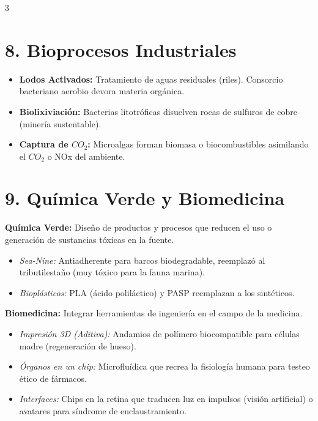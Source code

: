 \documentclass[9pt,letterpaper]{extarticle}
\begin{document}
\begin{multicols*}{3}
	\section*{8. Bioprocesos Industriales}
	\begin{itemize}
		\item \textbf{Lodos Activados:} Tratamiento de aguas residuales (riles). Consorcio bacteriano aerobio devora materia orgánica.
		\item \textbf{Biolixiviación:} Bacterias litotróficas disuelven rocas de sulfuros de cobre (minería sustentable).
		\item \textbf{Captura de $CO_2$:} Microalgas forman biomasa o biocombustibles asimilando el $CO_2$ o NOx del ambiente.
	\end{itemize}

	\section*{9. Química Verde y Biomedicina}
	\textbf{Química Verde:} Diseño de productos y procesos que reducen el uso o generación de sustancias tóxicas en la fuente.
	\begin{itemize}
		\item \textit{Sea-Nine:} Antiadherente para barcos biodegradable, reemplazó al tributilestaño (muy tóxico para la fauna marina).
		\item \textit{Bioplásticos:} PLA (ácido poliláctico) y PASP reemplazan a los sintéticos.
	\end{itemize}
	\textbf{Biomedicina:} Integrar herramientas de ingeniería en el campo de la medicina.
	\begin{itemize}
		\item \textit{Impresión 3D (Aditiva):} Andamios de polímero biocompatible para células madre (regeneración de hueso).
		\item \textit{Órganos en un chip:} Microfluídica que recrea la fisiología humana para testeo ético de fármacos.
		\item \textit{Interfaces:} Chips en la retina que traducen luz en impulsos (visión artificial) o avatares para síndrome de enclaustramiento.
	\end{itemize}


\end{multicols*}
\end{document}
